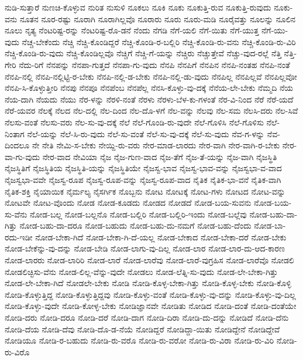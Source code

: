 {ನುಡಿ-ಸುತ್ತಾರೆ
ನುಣಚಿ-ಕೊಳ್ಳುವ
ನುರಿತ
ನುಸುಳಿ
ನೂಕಲು
ನೂಕಿ
ನೂಕು
ನೂಕುತ್ತಿ-ರುವ
ನೂಕುತ್ತಿ-ರುವುದು
ನೂಕು-ವನು
ನೂತನ
ನೂರ-ರಷ್ಟು
ನೂರಾಗಿ
ನೂರಾಗಿಲ್ಲವೊ
ನೂರಾರು
ನೂರು
ನೂರು-ಮಡಿ
ನೂರೈವತ್ತು
ನೂಲನ್ನು
ನೂಲಿನ
ನೂಲು
ನೃತ್ಯ
ನೆಂಟರಿಷ್ಟ-ರನ್ನು
ನೆಂಟರಿಷ್ಟ-ರೊ-ಡನೆ
ನೆಂದು
ನೆಗಡಿ
ನೆಗೆ-ಯಲಿ
ನೆಗೆ-ಯಿತು
ನೆಗೆ-ಯುತ್ತ
ನೆಗೆ-ಯು-ವುದು
ನೆಚ್ಚ-ಬೇಕೆಂದು
ನೆಚ್ಚಿ
ನೆಚ್ಚಿ-ಕೊಂಡಿದ್ದರೆ
ನೆಚ್ಚಿ-ಕೊಂಡಿ-ರ-ಬಲ್ಲಿರಿ
ನೆಚ್ಚಿ-ಕೊಂಡಿ-ರು-ವನು
ನೆಚ್ಚಿ-ಕೊಂಡಿ-ರು-ವಿರಿ
ನೆಚ್ಚಿ-ಕೊಂಡಿ-ರು-ವುದು
ನೆಚ್ಚಿ-ಕೊಂಡಿಲ್ಲವೊ
ನೆಚ್ಚಿಗೆ
ನೆಚ್ಚಿ-ಗೆ-ಯನ್ನು
ನೆಚ್ಚಿರು
ನೆಚ್ಚುತ್ತೇವೆ
ನೆಚ್ಚು-ವುದ-ರಲ್ಲೆ
ನೆತ್ತಿ
ನೆತ್ತಿ-ಗೇರಿ
ನೆದು-ರಿಗೆ
ನೆನಪನ್ನು
ನೆನಪಾ-ಗುತ್ತದೆ
ನೆನಪಾ-ಗು-ವುದು
ನೆನಪಿ
ನೆನಪಿಗೆ
ನೆನಪಿನ
ನೆನಪಿ-ನಂತಹ
ನೆನಪಿ-ನಂತೆ
ನೆನಪಿ-ನಲ್ಲಿ
ನೆನಪಿ-ನಲ್ಲಿಟ್ಟಿ-ರ-ಬೇಕು
ನೆನಪಿ-ನಲ್ಲಿ-ಡ-ಬೇಕು
ನೆನಪಿ-ನಲ್ಲಿ-ಡು-ವುದು
ನೆನಪಿಲ್ಲ
ನೆನಪಿಲ್ಲವೆ
ನೆನಪಿಲ್ಲವೋ
ನೆನಪಿ-ಸಿ-ಕೊಳ್ಳುತ್ತೀರಿ
ನೆನಪು
ನೆನಪೂ
ನೆನಪೆಂಬ
ನೆನಪೆಲ್ಲ
ನೆನಸಿ-ಕೊಳ್ಳು-ವು-ದಕ್ಕೆ
ನೆನೆಯ-ಲೇ-ಬೇಕು
ನೆಮ್ಮದಿ
ನೆಯ
ನೆಯ-ದಾಗಿ
ನೆಯದು
ನೆಯು
ನೆರ-ಳನ್ನು
ನೆರಳಿ-ನಂತೆ
ನೆರಳು
ನೆರಳು-ಬೆಳ-ಕು-ಗಳಂತೆ
ನೆರ-ವಿ-ನಿಂದ
ನೆರೆ
ನೆರೆ-ಯದೆ
ನೆರೆ-ಯವರ
ನೆಲಕ್ಕೆ
ನೆಲದ
ನೆಲ-ದಲ್ಲಿ
ನೆಲ-ದಿಂದ
ನೆಲ-ದೊ-ಳಗೆ
ನೆಲ-ವನ್ನು
ನೆಲವು
ನೆಲ-ಸಮ
ನೆಲಸಿ-ದರು
ನೆಲ-ಸಿವೆ
ನೆಲಸು-ವಂತೆ
ನೆಲಸು-ವರು
ನೆಲ-ಸು-ವು-ದಕ್ಕೆ
ನೆಲೆ
ನೆಲೆ-ಗೊಂಡಿ-ರು-ವುದೇ
ನೆಲೆ-ಗೊಳಿಸಿ
ನೆಲೆ-ಗೊಳಿಸು
ನೆಲೆ-ನಿಂತಾಗ
ನೆಲೆ-ಯನ್ನು
ನೆಲೆ-ಸಿ-ರು-ವುದು
ನೆಲೆ-ಸು-ವಂತೆ
ನೆಲೆ-ಸು-ವು-ದಕ್ಕೆ
ನೆಲೆ-ಸು-ವುದು
ನೆವ-ಗ-ಳನ್ನು
ನೆವ-ದಿಂದಲೂ
ನೇ
ನೇತಿ
ನೇಮಿ-ಸ-ಬೇಕು
ನೇಯ್ದಿ-ರು-ವರು
ನೇರ-ಮಾಡ-ಲಾರದು
ನೇರ-ವಾಗಿ
ನೇರ-ವಾಗಿ-ರ-ಬೇಕು
ನೇರ-ವಾ-ಗು-ವುದು
ನೇರ-ವಾದ
ನೇವಿಯಾ
ನೈಜ
ನೈಜ-ಗುಣ-ವಾದ
ನೈಜ-ತೆಗೆ
ನೈಜ-ತೆ-ಯನ್ನು
ನೈಜ-ವಾಗಿ
ನೈಜಸ್ಥಿತಿ
ನೈಜಸ್ಥಿತಿಗೆ
ನೈಜಸ್ಥಿತಿಯ
ನೈಜಸ್ಥಿತಿ-ಯನ್ನು
ನೈಜಸ್ಥಿತಿಯೇ
ನೈಜಸ್ವ-ಭಾವ
ನೈಜಸ್ವ-ಭಾವ-ವನ್ನು
ನೈಜಸ್ವಭಾ-ವ-ವಾದ
ನೈಜಸ್ವಭಾ-ವವೇ
ನೈಜಸ್ವ-ರೂಪ
ನೈಜಸ್ವ-ರೂಪ-ವನ್ನು
ನೈಜಸ್ವ-ರೂಪ-ವಾದ
ನೈತಿಕ
ನೈತಿಕ-ಭಾ-ವನೆ
ನೈತಿಕ-ವಾಗಿ
ನೈತಿಕ-ಶಕ್ತಿ
ನೈಯಾಯಿಕ
ನೈರ್ಮಲ್ಯ
ನೈಸರ್ಗಿಕ
ನೊಬ್ಬನು
ನೋಟ
ನೋಟಕ್ಕೆ
ನೋಟ-ಗಳು
ನೋಟದ
ನೋಟ-ವನ್ನು
ನೋಟವೇ
ನೋಟ-ವೊಂದು
ನೋಡ
ನೋಡ-ಕೂಡದು
ನೋಡದ
ನೋಡದೆ
ನೋಡ-ಬಯ-ಸುವನು
ನೋಡ-ಬಯ-ಸು-ವೆನು
ನೋಡ-ಬಲ್ಲ
ನೋಡ-ಬಲ್ಲನೊ
ನೋಡ-ಬಲ್ಲಿರಿ
ನೋಡ-ಬಲ್ಲಿರಿ-ಇಂದು
ನೋಡ-ಬಲ್ಲೆವು
ನೋಡ-ಬಹು-ದಾ-ಗಿತ್ತು
ನೋಡ-ಬಹು-ದಾ-ದರೂ
ನೋಡ-ಬಹುದು
ನೋಡ-ಬಹು-ದು-ನಮಗೆ
ನೋಡ-ಬಹು-ದೆಂದು
ನೋಡ-ಬಾ-ರದು-ಇಡೀ
ನೋಡ-ಬೇಕಾ-ಗಿದೆ
ನೋಡ-ಬೇಕಾ-ಗಿ-ದೆ-ಯಲ್ಲ
ನೋಡ-ಬೇಕಾದ
ನೋಡ-ಬೇಕಾ-ದರೆ
ನೋಡ-ಬೇಕು
ನೋಡ-ಬೇಕೆನ್ನು-ವು-ದನ್ನು
ನೋಡ-ಬೇಡಿ
ನೋಡ-ಲಾಗು-ವು-ದಿಲ್ಲ
ನೋಡ-ಲಾರ
ನೋಡ-ಲಾರ-ದು-ಆದ-ಕಾರಣ
ನೋಡ-ಲಾರರು
ನೋಡ-ಲಾರಿರಿ
ನೋಡ-ಲಾರೆ
ನೋಡ-ಲಾರೆವು
ನೋಡ-ಲಾರೆ-ವುಗ್ರಹಿಸ
ನೋಡ-ಲಾರೆವೊ
ನೋಡಲಿ
ನೋಡಲಿಚ್ಛಿಸು-ವೆನು
ನೋಡ-ಲಿಲ್ಲ-ವೆನ್ನು-ವುದೇ
ನೋಡಲು
ನೋಡ-ಲೆತ್ನಿ-ಸು-ವುದು
ನೋಡ-ಲೇ-ಬೇಕಾ-ಗಿತ್ತು
ನೋಡ-ಲೇ-ಬೇಕಾ-ಗಿದೆ
ನೋಡಲೇ-ಬೇಕು
ನೋಡಿ
ನೋಡಿ-ಕೊಳ್ಳ-ಬೇಕಾ-ಗಿತ್ತು
ನೋಡಿ-ಕೊಳ್ಳ-ಬೇಕು
ನೋಡಿ-ಕೊಳ್ಳಿ
ನೋಡಿ-ಕೊಳ್ಳುತ್ತಿದ್ದ
ನೋಡಿ-ಕೊಳ್ಳುತ್ತಿದ್ದವು
ನೋಡಿ-ಕೊಳ್ಳು-ವಂತೆ
ನೋಡಿ-ಕೊಳ್ಳು-ವು-ದನ್ನು
ನೋಡಿ-ಕೊಳ್ಳು-ವು-ದಿಲ್ಲ
ನೋಡಿ-ಕೊಳ್ಳು-ವುದೇ
ನೋಡಿ-ಕೋಳ್ಳ-ಬೇಕು
ನೋಡಿಜ್ಞಾನವೇ
ನೋಡಿತು
ನೋಡಿದ
ನೋಡಿ-ದಂತೆ
ನೋಡಿ-ದಂತೆಯೇ
ನೋಡಿ-ದರು
ನೋಡಿ-ದರೂ
ನೋಡಿ-ದರೆ
ನೋಡಿ-ದಾಗ
ನೋಡಿ-ದಿರಾ
ನೋಡಿ-ದು-ದನ್ನು
ನೋಡಿದೆ
ನೋಡಿ-ದೆನು
ನೋಡಿ-ದೆಯ
ನೋಡಿ-ದೆವು
ನೋಡಿ-ದೊ-ಡ-ನೆಯೆ
ನೋಡಿದ್ದರೆ
ನೋಡಿದ್ದಾ-ಯಿತು
ನೋಡಿದ್ದೇನೆ
ನೋಡಿದ್ದೇವೆ
ನೋಡಿಯೂ
ನೋಡಿ-ರ-ಬಹುದು
ನೋಡಿ-ರು-ವರೊ
ನೋಡಿ-ರು-ವರೋ
ನೋಡಿ-ರು-ವಿರಾ
ನೋಡಿ-ರು-ವಿರಿ
ನೋಡಿ-ರು-ವಿರೊ
}
